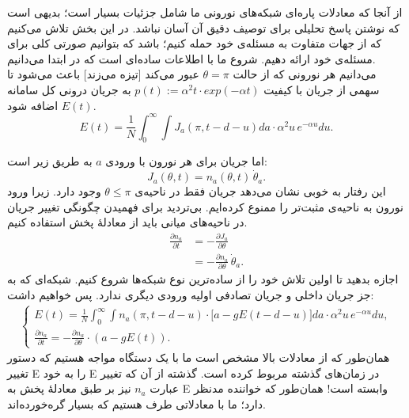 
	\label{chap:analytics}

از آنجا که معادلات پاره‌ای شبکه‌های نورونی ما شامل جزئیات بسیار است؛ بدیهی است که نوشتن پاسخ تحلیلی برای توصیف دقیق آن آسان نباشد. در این بخش تلاش می‌کنیم که از جهات متفاوت به مسئله‌ی خود حمله کنیم؛ باشد که بتوانیم صورتی کلی برای مسئله‌ی خود ارائه دهیم. شروع ما با اطلاعات ساده‌ای است که در ابتدا می‌دانیم.\\

می‌دانیم هر نورونی که از حالت $\theta = \pi$ عبور می‌کند [تیزه می‌زند] باعث می‌شود تا سهمی از جریان با کیفیت $p(t):= \alpha^2 t \cdot exp(-\alpha t)$ به جریان درونی کل سامانه $E(t)$ اضافه شود.
\begin{equation}
	E(t) = \frac{1}{N}\int_{0}^{\infty} \int J_a (\pi,t-d-u) da \cdot \alpha^2 u\, e^{-\alpha u} du .
	\label{eq:general_field}
\end{equation}

اما جریان برای هر نورون با ورودی $a$ به طریق زیر است:
\begin{equation}
	J_a (\theta, t) = n_a(\theta,t) \, \dot \theta_a .
\end{equation}
این رفتار به خوبی نشان می‌دهد جریان فقط در ناحیه‌ی $\theta \leq \pi$ وجود دارد. زیرا ورود نورون به ناحیه‌ی مثبت‌تر را ممنوع کرده‌ایم.  بی‌تردید برای فهمیدن چگونگی تغییر جریان در ناحیه‌های میانی باید از معادلهٔ پخش استفاده کنیم.
\begin{align}
	\frac{\partial n_a}{\partial t} &= - \frac{\partial J_a}{\partial \theta} \label{eq:continuity_relation}\\
	&= - \frac{\partial n_a}{\partial \theta} \, \dot \theta_a .
\end{align}
اجازه بدهید تا اولین تلاش خود را از ساده‌ترین نوع شبکه‌ها شروع کنیم. شبکه‌ای که به جز جریان داخلی و جریان تصادفی اولیه ورودی دیگری ندارد. پس خواهیم داشت:
\begin{align}
	\begin{cases}
		E(t) = \frac{1}{N} \int_{0}^{\infty} \int n_a(\pi,t-d-u) \cdot \big[ a - g E(t-d-u) \big] da \cdot \alpha^2 u\, e^{-\alpha u} du , \\
		\frac{\partial n_a}{\partial t} = - \frac{\partial n_a}{\partial \theta} \cdot (a - g E(t) ) .
	\end{cases}
	\label{eq:simple_network}
\end{align}
همان‌طور که از معادلات بالا مشخص است ما با یک دستگاه مواجه هستیم که دستور تغییر E را به خود E در زمان‌های گذشته مربوط کرده است. گذشته از آن که تغییر عبارت
$n_a$
نیز بر طبق معادلهٔ پخش به E وابسته است! همان‌طور که خواننده مدنظر دارد؛ ما با معادلاتی طرف هستیم که بسیار گره‌خورده‌اند.\\

